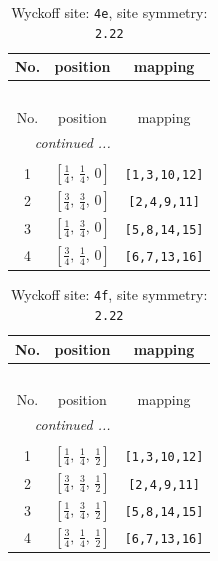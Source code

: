 \documentclass[fleqn,8pt]{jsarticle}
\begin{document}
\begin{longtable}{ccc}
\caption{Wyckoff site: {\tt 4e}, site symmetry: {\tt 2.22}}
 \\
 \hline \hline
No. & position & mapping \\ \hline \endfirsthead

\multicolumn{2}{l}{\tablename\ \thetable{}} \\
 \hline \hline
No. & position & mapping \\ \hline \endhead

 \hline \hline
\multicolumn{2}{r}{\footnotesize\it continued ...} \\ \endfoot

 \hline \hline
\multicolumn{2}{r}{} \\ \endlastfoot

1 & $\left[ \frac{1}{4},\, \frac{1}{4},\, 0 \right]$ & {\tt [1,3,10,12]} \\ \hline
2 & $\left[ \frac{3}{4},\, \frac{3}{4},\, 0 \right]$ & {\tt [2,4,9,11]} \\ \hline
3 & $\left[ \frac{1}{4},\, \frac{3}{4},\, 0 \right]$ & {\tt [5,8,14,15]} \\ \hline
4 & $\left[ \frac{3}{4},\, \frac{1}{4},\, 0 \right]$ & {\tt [6,7,13,16]} \\
\end{longtable}
\renewcommand{\arraystretch}{1.2}
\begin{longtable}{ccc}
\caption{Wyckoff site: {\tt 4f}, site symmetry: {\tt 2.22}}
 \\
 \hline \hline
No. & position & mapping \\ \hline \endfirsthead

\multicolumn{2}{l}{\tablename\ \thetable{}} \\
 \hline \hline
No. & position & mapping \\ \hline \endhead

 \hline \hline
\multicolumn{2}{r}{\footnotesize\it continued ...} \\ \endfoot

 \hline \hline
\multicolumn{2}{r}{} \\ \endlastfoot

1 & $\left[ \frac{1}{4},\, \frac{1}{4},\, \frac{1}{2} \right]$ & {\tt [1,3,10,12]} \\ \hline
2 & $\left[ \frac{3}{4},\, \frac{3}{4},\, \frac{1}{2} \right]$ & {\tt [2,4,9,11]} \\ \hline
3 & $\left[ \frac{1}{4},\, \frac{3}{4},\, \frac{1}{2} \right]$ & {\tt [5,8,14,15]} \\ \hline
4 & $\left[ \frac{3}{4},\, \frac{1}{4},\, \frac{1}{2} \right]$ & {\tt [6,7,13,16]} \\
\end{longtable}
\end{document}
